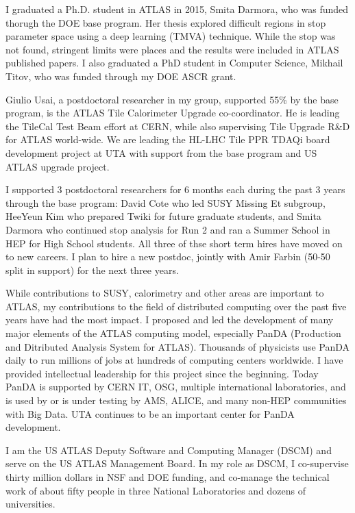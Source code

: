 I graduated a Ph.D. student in ATLAS in 2015, Smita Darmora, who was funded thorugh the DOE base program. Her thesis explored difficult regions in stop parameter space using a deep learning (TMVA) technique. While the stop was not found, stringent limits were places and the results were included in ATLAS published papers. I also graduated a PhD student in Computer Science, Mikhail Titov, who was funded through my DOE ASCR grant.

Giulio Usai, a postdoctoral researcher in my group, supported 55\% by the base program, is the ATLAS Tile Calorimeter Upgrade co-coordinator. He is leading the TileCal Test Beam effort at CERN, while also supervising Tile Upgrade R\&D for ATLAS world-wide. We are leading the HL-LHC Tile PPR TDAQi board development project at UTA with support from the base program and US ATLAS upgrade project.

I supported 3 postdoctoral researchers for 6 months each during the past 3 years through the base program: David Cote who led SUSY Missing Et subgroup, HeeYeun Kim who prepared Twiki for future graduate students, and Smita Darmora who continued stop analysis for Run 2 and ran a Summer School in HEP for High School students. All three of thse short term hires have moved on to new careers. I plan to hire a new postdoc, jointly with Amir Farbin (50-50 split in support) for the next three years.

While contributions to SUSY, calorimetry and other areas are important to ATLAS, my contributions to the field of distributed computing over the past five years have had the most impact. I proposed and led the development of many major elements of the ATLAS computing model, especially PanDA (Production and Ditributed Analysis System for ATLAS). Thousands of physicists use PanDA daily to run millions of jobs at hundreds of computing centers worldwide. I have provided intellectual leadership for this project since the beginning. Today PanDA is supported by CERN IT, OSG, multiple international laboratories, and is used by or is under testing by AMS, ALICE, and many non-HEP communities with Big Data. UTA continues to be an important center for PanDA development.

I am the US ATLAS Deputy Software and Computing Manager (DSCM) and serve on the US ATLAS Management Board. In my role as DSCM, I co-supervise thirty million dollars in NSF and DOE funding, and co-manage the technical work of about fifty people in three National Laboratories and dozens of universities.

